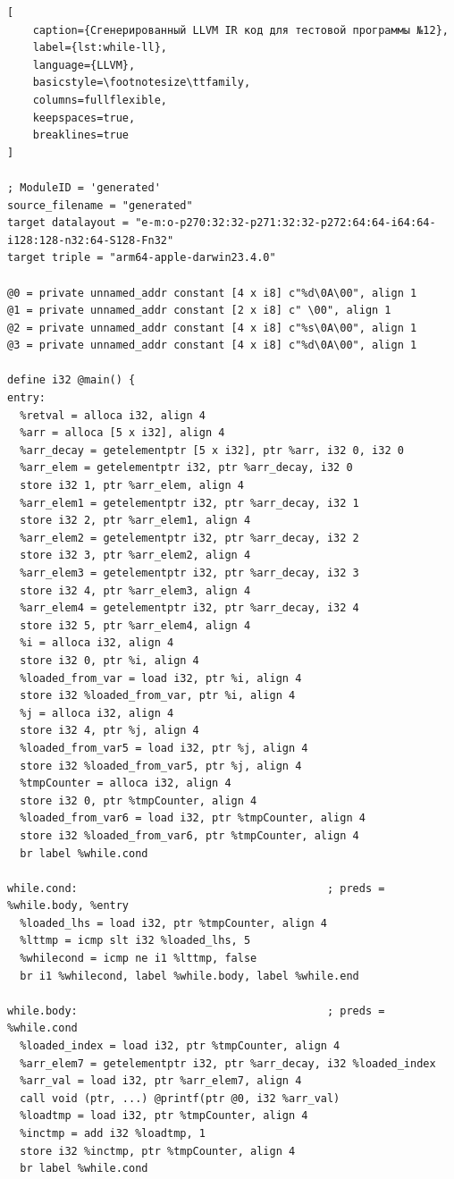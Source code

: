\begin{lstlisting}[
    caption={Сгенерированный LLVM IR код для тестовой программы №12},
    label={lst:while-ll},
    language={LLVM},
    basicstyle=\footnotesize\ttfamily,
    columns=fullflexible,
    keepspaces=true,
    breaklines=true
]

; ModuleID = 'generated'
source_filename = "generated"
target datalayout = "e-m:o-p270:32:32-p271:32:32-p272:64:64-i64:64-i128:128-n32:64-S128-Fn32"
target triple = "arm64-apple-darwin23.4.0"

@0 = private unnamed_addr constant [4 x i8] c"%d\0A\00", align 1
@1 = private unnamed_addr constant [2 x i8] c" \00", align 1
@2 = private unnamed_addr constant [4 x i8] c"%s\0A\00", align 1
@3 = private unnamed_addr constant [4 x i8] c"%d\0A\00", align 1

define i32 @main() {
entry:
  %retval = alloca i32, align 4
  %arr = alloca [5 x i32], align 4
  %arr_decay = getelementptr [5 x i32], ptr %arr, i32 0, i32 0
  %arr_elem = getelementptr i32, ptr %arr_decay, i32 0
  store i32 1, ptr %arr_elem, align 4
  %arr_elem1 = getelementptr i32, ptr %arr_decay, i32 1
  store i32 2, ptr %arr_elem1, align 4
  %arr_elem2 = getelementptr i32, ptr %arr_decay, i32 2
  store i32 3, ptr %arr_elem2, align 4
  %arr_elem3 = getelementptr i32, ptr %arr_decay, i32 3
  store i32 4, ptr %arr_elem3, align 4
  %arr_elem4 = getelementptr i32, ptr %arr_decay, i32 4
  store i32 5, ptr %arr_elem4, align 4
  %i = alloca i32, align 4
  store i32 0, ptr %i, align 4
  %loaded_from_var = load i32, ptr %i, align 4
  store i32 %loaded_from_var, ptr %i, align 4
  %j = alloca i32, align 4
  store i32 4, ptr %j, align 4
  %loaded_from_var5 = load i32, ptr %j, align 4
  store i32 %loaded_from_var5, ptr %j, align 4
  %tmpCounter = alloca i32, align 4
  store i32 0, ptr %tmpCounter, align 4
  %loaded_from_var6 = load i32, ptr %tmpCounter, align 4
  store i32 %loaded_from_var6, ptr %tmpCounter, align 4
  br label %while.cond

while.cond:                                       ; preds = %while.body, %entry
  %loaded_lhs = load i32, ptr %tmpCounter, align 4
  %lttmp = icmp slt i32 %loaded_lhs, 5
  %whilecond = icmp ne i1 %lttmp, false
  br i1 %whilecond, label %while.body, label %while.end

while.body:                                       ; preds = %while.cond
  %loaded_index = load i32, ptr %tmpCounter, align 4
  %arr_elem7 = getelementptr i32, ptr %arr_decay, i32 %loaded_index
  %arr_val = load i32, ptr %arr_elem7, align 4
  call void (ptr, ...) @printf(ptr @0, i32 %arr_val)
  %loadtmp = load i32, ptr %tmpCounter, align 4
  %inctmp = add i32 %loadtmp, 1
  store i32 %inctmp, ptr %tmpCounter, align 4
  br label %while.cond


\end{lstlisting}
